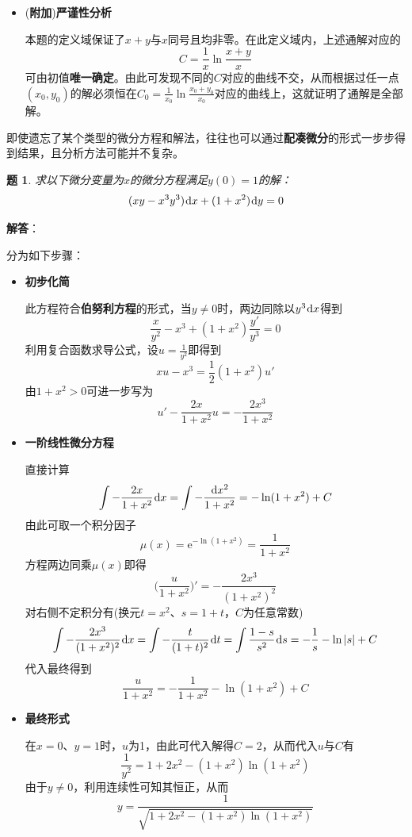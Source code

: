 \documentclass[a4paper,UTF8,fontset=windows,AutoFakeBold]{ctexart}
\newcommand*{\dr}{\hspace{0.07em}\mathrm{d}}
\newcommand*{\er}{\mathrm{e}}
\newcommand*{\extra}{\textbf{附加}}
\newcommand*{\note}{\noindent *}
\theoremstyle{ex}
\newtheorem{exercise}{题}
\newcommand{\sol}[1]{{\vspace{5pt}\kaishu\noindent\textbf{解答}：\vspace{-3pt}
\begin{compactitem}
    \item[] #1
\end{compactitem}
}}
\begin{document}
\begin{framed}
{\begin{itemize}
        \item (\extra)\textbf{严谨性分析}
        
        本题的定义域保证了$x+y$与$x$同号且均非零。在此定义域内，上述通解对应的
        $$C=\frac{1}{x}\ln\frac{x+y}{x}$$
        可由初值\textbf{唯一确定}。由此可发现不同的$C$对应的曲线不交，从而根据过任一点$(x_0,y_0)$的解必须恒在$C_0=\frac{1}{x_0}\ln\frac{x_0+y_0}{x_0}$对应的曲线上，这就证明了通解是全部解。
    \end{itemize}
}
\end{framed}

\note 即使遗忘了某个类型的微分方程和解法，往往也可以通过\textbf{配凑微分}的形式一步步得到结果，且分析方法可能并不复杂。

\begin{framed}
\begin{exercise}
    求以下微分变量为$x$的微分方程满足$y(0)=1$的解：
    $$(xy-x^3y^3)\dr x+(1+x^2)\dr y=0$$
\end{exercise}
\sol{
    分为如下步骤：
    \begin{itemize}
        \item \textbf{初步化简}
        
        此方程符合\textbf{伯努利方程}的形式，当$y\ne0$时，两边同除以$y^3\dr x$得到
        $$\frac{x}{y^2}-x^3+(1+x^2)\frac{y'}{y^3}=0$$
        利用复合函数求导公式，设$u=\frac{1}{y^2}$即得到
        $$xu-x^3=\frac{1}{2}(1+x^2)u'$$
        由$1+x^2>0$可进一步写为
        $$u'-\frac{2x}{1+x^2}u=-\frac{2x^3}{1+x^2}$$

        \item \textbf{一阶线性微分方程}
        
        直接计算
        $$\int-\frac{2x}{1+x^2}\dr x=\int-\frac{\dr x^2}{1+x^2}=-\ln(1+x^2)+C$$
        由此可取一个积分因子
        $$\mu(x)=\er^{-\ln(1+x^2)}=\frac{1}{1+x^2}$$
        方程两边同乘$\mu(x)$即得
        $$\bigg(\frac{u}{1+x^2}\bigg)'=-\frac{2x^3}{(1+x^2)^2}$$
        对右侧不定积分有(换元$t=x^2$、$s=1+t$，$C$为任意常数)
        $$\int-\frac{2x^3}{(1+x^2)^2}\dr x=\int-\frac{t}{(1+t)^2}\dr t=\int\frac{1-s}{s^2}\dr s=-\frac{1}{s}-\ln|s|+C$$
        代入最终得到
        $$\frac{u}{1+x^2}=-\frac{1}{1+x^2}-\ln(1+x^2)+C$$

        \item \textbf{最终形式}
    
        在$x=0$、$y=1$时，$u$为1，由此可代入解得$C=2$，从而代入$u$与$C$有
        $$\frac{1}{y^2}=1+2x^2-(1+x^2)\ln(1+x^2)$$
        由于$y\ne0$，利用连续性可知其恒正，从而
        $$y=\frac{1}{\sqrt{1+2x^2-(1+x^2)\ln(1+x^2)}}$$


\end{itemize}}
\end{framed}
\end{document}
